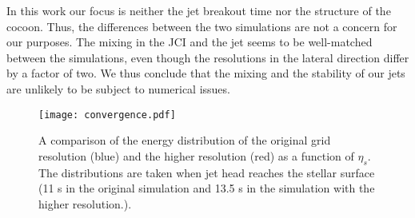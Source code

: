 \documentclass[fleqn,usenatbib]{mnras}
\begin{document}
	In this work our focus is neither the jet breakout time nor the structure of the cocoon. Thus, the differences between the two simulations are not a concern for our purposes. The mixing in the JCI and the jet seems to be well-matched between the simulations, even though the resolutions in the lateral direction differ by a factor of two. We thus conclude that the mixing and the stability of our jets are unlikely to be subject to numerical issues.
	
	\begin{figure}
		\centering
		\texttt{[image: convergence.pdf]}
		\caption[Convergence]{
			A comparison of the energy distribution of the original grid resolution (blue) and the higher resolution (red) as a function of $ \eta_s $. The distributions are taken when jet head reaches the stellar surface (11 s in the original simulation and 13.5 s in the simulation with the higher resolution.).
		}
		\label{fig:convergence}
	\end{figure}
	
	\label{lastpage}
\end{document}
